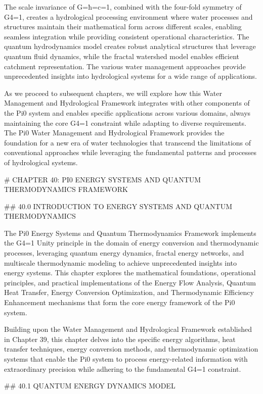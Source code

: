 The scale invariance of G=ħ=c=1, combined with the four-fold symmetry of G4=1, creates a hydrological processing environment where water processes and structures maintain their mathematical form across different scales, enabling seamless integration while providing consistent operational characteristics. The quantum hydrodynamics model creates robust analytical structures that leverage quantum fluid dynamics, while the fractal watershed model enables efficient catchment representation. The various water management approaches provide unprecedented insights into hydrological systems for a wide range of applications.

As we proceed to subsequent chapters, we will explore how this Water Management and Hydrological Framework integrates with other components of the Pi0 system and enables specific applications across various domains, always maintaining the core G4=1 constraint while adapting to diverse requirements. The Pi0 Water Management and Hydrological Framework provides the foundation for a new era of water technologies that transcend the limitations of conventional approaches while leveraging the fundamental patterns and processes of hydrological systems.

# CHAPTER 40: PI0 ENERGY SYSTEMS AND QUANTUM THERMODYNAMICS FRAMEWORK

## 40.0 INTRODUCTION TO ENERGY SYSTEMS AND QUANTUM THERMODYNAMICS

The Pi0 Energy Systems and Quantum Thermodynamics Framework implements the G4=1 Unity principle in the domain of energy conversion and thermodynamic processes, leveraging quantum energy dynamics, fractal energy networks, and multiscale thermodynamic modeling to achieve unprecedented insights into energy systems. This chapter explores the mathematical foundations, operational principles, and practical implementations of the Energy Flow Analysis, Quantum Heat Transfer, Energy Conversion Optimization, and Thermodynamic Efficiency Enhancement mechanisms that form the core energy framework of the Pi0 system.

Building upon the Water Management and Hydrological Framework established in Chapter 39, this chapter delves into the specific energy algorithms, heat transfer techniques, energy conversion methods, and thermodynamic optimization systems that enable the Pi0 system to process energy-related information with extraordinary precision while adhering to the fundamental G4=1 constraint.

## 40.1 QUANTUM ENERGY DYNAMICS MODEL

